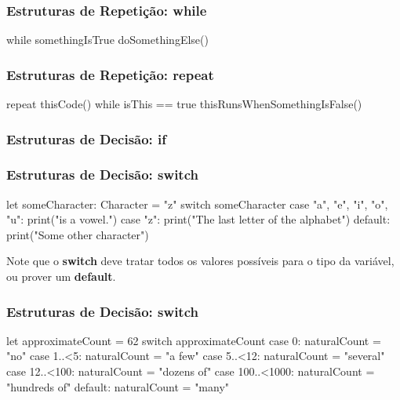 \begin{frame}[fragile]
    \frametitle{Estruturas de Repetição: \textbf{while}}

    \begin{swift}
        while somethingIsTrue {
            doSomethingElse()
        }
    \end{swift}
\end{frame}

\begin{frame}[fragile]
    \frametitle{Estruturas de Repetição: \textbf{repeat}}

    \begin{swift}
        repeat
            thisCode()
        while isThis == true
        thisRunsWhenSomethingIsFalse()
    \end{swift}
\end{frame}

\begin{frame}[fragile]
    \frametitle{Estruturas de Decisão: \textbf{if}}

\end{frame}

\begin{frame}[fragile]
    \frametitle{Estruturas de Decisão: \textbf{switch}}

    \begin{swift}
        let someCharacter: Character = "z"
        switch someCharacter {
        case "a", "e", "i", "o", "u":
            print("\someCharacter is a vowel.")
        case "z":
            print("The last letter of the alphabet")
        default:
            print("Some other character")
        }
    \end{swift}
    \vspace{.5cm}
    Note que o \textbf{switch} deve tratar todos os valores possíveis
    para o tipo da variável, ou prover um \textbf{default}.
\end{frame}

\begin{frame}[fragile]
    \frametitle{Estruturas de Decisão: \textbf{switch}}

    \begin{swift}
        let approximateCount = 62
        switch approximateCount {
        case 0:
            naturalCount = "no"
        case 1..<5:
            naturalCount = "a few"
        case 5..<12:
            naturalCount = "several"
        case 12..<100:
            naturalCount = "dozens of"
        case 100..<1000:
            naturalCount = "hundreds of"
        default:
            naturalCount = "many"
        }
    \end{swift}
\end{frame}

